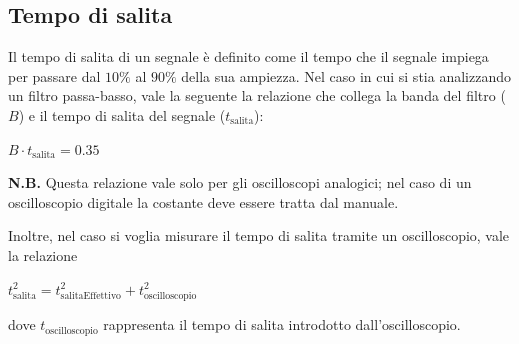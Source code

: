 \documentclass{article}
\begin{document}
		\subsection{Tempo di salita}
			Il tempo di salita di un segnale è definito come il tempo che il segnale impiega per passare dal $ 10\% $ al $ 90\% $ della sua ampiezza.
			\newline
			Nel caso in cui si stia analizzando un filtro passa-basso, vale la seguente la relazione che collega la banda del filtro ($ B $) e il tempo di salita del segnale ($ t_{\mathrm{salita}} $):
			\newline
			\begin{center}
				$ B \cdot t_{\mathrm{salita}} = 0.35 $
			\end{center}
			\newline
			\begin{scriptsize}
				\textbf{N.B.} Questa relazione vale solo per gli oscilloscopi analogici; nel caso di un oscilloscopio digitale la costante deve essere tratta dal manuale. 
			\end{scriptsize}
			\newline
			\newline
			Inoltre, nel caso si voglia misurare il tempo di salita tramite un oscilloscopio, vale la relazione
			\newline
			\begin{center}
				$ t_{\mathrm{salita}}^{2} = t_{\mathrm{salitaEffettivo}}^{2} + t_{\mathrm{oscilloscopio}}^{2} $
			\end{center}
			\newline
			dove $ t_{\mathrm{oscilloscopio}} $ rappresenta il tempo di salita introdotto dall’oscilloscopio.
\end{document}
